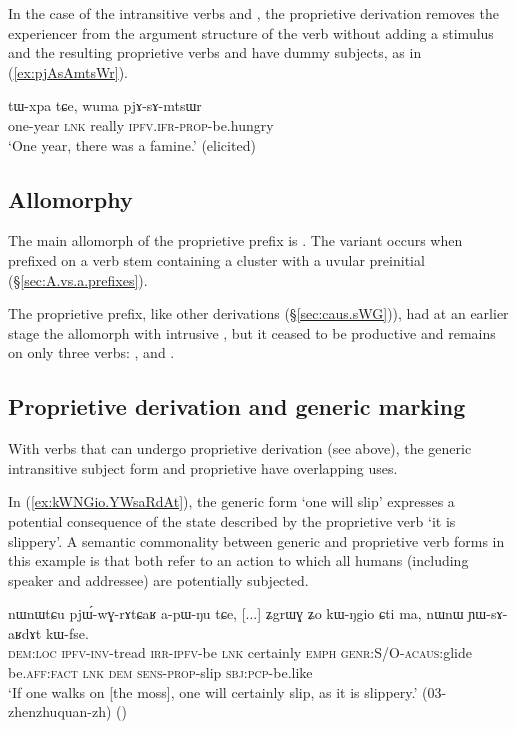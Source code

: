In the case of the intransitive verbs  and , the proprietive derivation removes the experiencer from the argument structure of the verb without adding a stimulus and the resulting proprietive verbs  and  have dummy subjects, as in (\ref{ex:pjAsAmtsWr}).

\begin{exe}
\ex \label{ex:pjAsAmtsWr}
\gll tɯ-xpa tɕe, wuma pjɤ-sɤ-mtsɯr \\
one-year \textsc{lnk} really \textsc{ipfv}.\textsc{ifr}-\textsc{prop}-be.hungry \\
\glt `One year, there was a famine.' (elicited)
\end{exe}

\subsection{Allomorphy} \label{sec:proprietive.allomorphy}
The main allomorph of the proprietive prefix is . The variant  occurs when prefixed on a verb stem containing a cluster with a uvular preinitial (§\ref{sec:A.vs.a.prefixes}). 

The proprietive prefix, like other derivations (§\ref{sec:caus.sWG})), had at an earlier stage the allomorph  with intrusive , but it ceased to be productive and remains on only three verbs: ,  and .

\subsection{Proprietive derivation and generic marking} \label{sec:proprietive.generic}
With verbs that can undergo proprietive derivation (see above), the generic intransitive subject  form and proprietive have overlapping uses. 

In (\ref{ex:kWNGio.YWsaRdAt}), the generic form  `one will slip' expresses a potential consequence of the state described by the proprietive verb  `it is slippery'. A semantic commonality between generic and proprietive verb forms in this example is that both refer to an action to which all humans (including speaker and addressee) are potentially subjected.

\begin{exe}
\ex \label{ex:kWNGio.YWsaRdAt}
\gll nɯnɯtɕu pjɯ́-wɣ-rɤtɕaʁ a-pɯ-ŋu tɕe, [...] ʑgrɯɣ ʑo kɯ-ŋgio ɕti ma, nɯnɯ ɲɯ-sɤ-aʁdɤt kɯ-fse. \\
\textsc{dem}:\textsc{loc} \textsc{ipfv}-\textsc{inv}-tread \textsc{irr}-\textsc{ipfv}-be \textsc{lnk} { } certainly \textsc{emph} \textsc{genr}:S/O-\textsc{acaus}:glide be.\textsc{aff}:\textsc{fact} \textsc{lnk} \textsc{dem} \textsc{sens}-\textsc{prop}-slip \textsc{sbj}:\textsc{pcp}-be.like \\
\glt `If one walks on [the moss], one will certainly slip, as it is slippery.' (03-zhenzhuquan-zh) ()
\end{exe}

